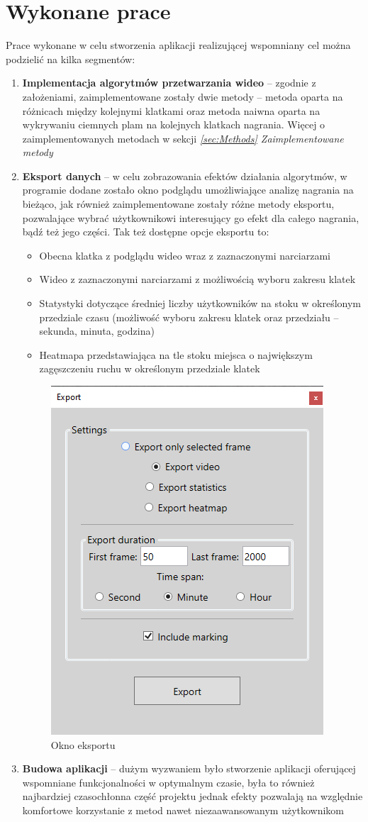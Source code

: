 \documentclass[a4paper]{article}
\begin{document}
\section{Wykonane prace}
Prace wykonane w celu stworzenia aplikacji realizującej wspomniany cel można podzielić na kilka segmentów:
\begin{enumerate}
\item \textbf{Implementacja algorytmów przetwarzania wideo} – zgodnie z założeniami, zaimplementowane zostały dwie metody – metoda oparta na różnicach między kolejnymi klatkami oraz metoda naiwna oparta na wykrywaniu ciemnych plam na kolejnych klatkach nagrania. Więcej o zaimplementowanych metodach w sekcji \textit{\ref{sec:Methods} Zaimplementowane metody}
\item \textbf{Eksport danych} – w celu zobrazowania efektów działania algorytmów, w programie dodane zostało okno podglądu umożliwiające analizę nagrania na bieżąco, jak również zaimplementowane zostały różne metody eksportu, pozwalające wybrać użytkownikowi interesujący go efekt dla całego nagrania, bądź też jego części. Tak też dostępne opcje eksportu to:
\begin{itemize}
\item Obecna klatka z podglądu wideo wraz z zaznaczonymi narciarzami
\item Wideo z zaznaczonymi narciarzami  z możliwością wyboru zakresu klatek
\item Statystyki dotyczące średniej liczby użytkowników na stoku w określonym przedziale czasu (możliwość wyboru zakresu klatek oraz przedziału – sekunda, minuta, godzina)
\item Heatmapa przedstawiająca na tle stoku miejsca o największym zagęszczeniu ruchu w określonym przedziale klatek
\end{itemize}
\begin{figure}[H]
  \centering
  \includegraphics[width=0.4\linewidth]{resources/img4.png}
  \caption{Okno eksportu}
\end{figure}
\item \textbf{Budowa aplikacji} – dużym wyzwaniem było stworzenie aplikacji oferującej wspomniane funkcjonalności w optymalnym czasie, była to również najbardziej czasochłonna część projektu jednak efekty pozwalają na względnie komfortowe korzystanie z metod nawet niezaawansowanym użytkownikom
\end{enumerate}
\end{document}
